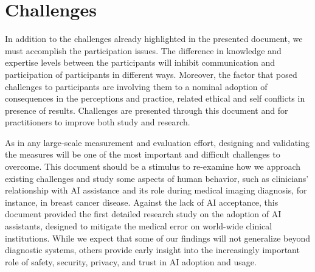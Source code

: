
\section{Challenges}
\label{sec:sec010}

In addition to the challenges already highlighted in the presented document, we must accomplish the participation issues.
The difference in knowledge and expertise levels between the participants will inhibit communication and participation of participants in different ways.
Moreover, the factor that posed challenges to participants are involving them to a nominal adoption of consequences in the perceptions and practice, related ethical and self conflicts in presence of results.
Challenges are presented through this document and for practitioners to improve both study and research.

As in any large-scale measurement and evaluation effort, designing and validating the measures will be one of the most important and difficult challenges to overcome.
This document should be a stimulus to re-examine how we approach existing challenges and study some aspects of human behavior, such as clinicians' relationship with AI assistance and its role during medical imaging diagnosis, for instance, in breast cancer disease.
Against the lack of AI acceptance, this document provided the first detailed research study on the adoption of AI assistants, designed to mitigate the medical error on world-wide clinical institutions.
While we expect that some of our findings will not generalize beyond diagnostic systems, others provide early insight into the increasingly important role of safety, security, privacy, and trust in AI adoption and usage.

